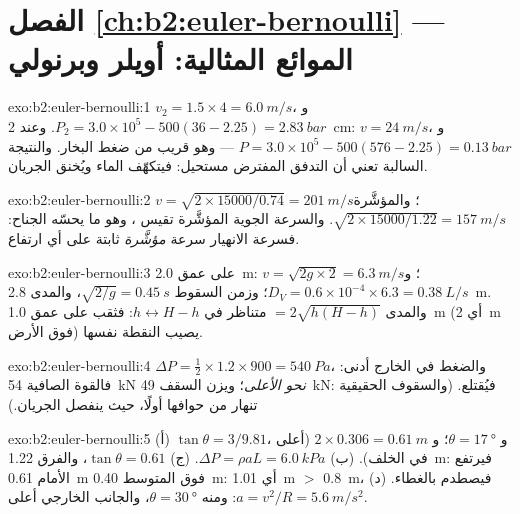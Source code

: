 \section*{الفصل \ref{ch:b2:euler-bernoulli} --- الموائع المثالية: أويلر وبرنولي}

\begin{solution}{exo:b2:euler-bernoulli:1}
$v_2 = 1.5 \times 4 = \qty{6.0}{m/s}$، و $P_2 = 3.0 \times 10^5 - 500(36 - 2.25) =
\qty{2.83}{bar}$. وعند \qty{2}{cm}: $v = \qty{24}{m/s}$، و $P = 3.0 \times 10^5 - 500
(576 - 2.25) = \qty{0.13}{bar}$ --- وهو قريب من ضغط البخار. والنتيجة
السالبة تعني أن التدفق المفترض مستحيل: فيتكهّف الماء
ويُخنق الجريان.
\end{solution}

\begin{solution}{exo:b2:euler-bernoulli:2}
$v = \sqrt{2 \times 15000/0.74} = \qty{201}{m/s}$؛ والمؤشَّرة $\sqrt{2 \times 15000/
1.22} = \qty{157}{m/s}$. والسرعة الجوية المؤشَّرة تقيس ،
وهو ما يحسّه الجناح: فسرعة الانهيار سرعة \emph{مؤشَّرة} ثابتة
على أي ارتفاع.
\end{solution}

\begin{solution}{exo:b2:euler-bernoulli:3}
على عمق \qty{2.0}{m}: $v = \sqrt{2g \times 2} = \qty{6.3}{m/s}$؛ و $D_V = 0.6 \times 10^{-4}
\times 6.3 = \qty{0.38}{L/s}$؛ وزمن السقوط $\sqrt{2/g} = \qty{0.45}{s}$، والمدى
\qty{2.8}{m}. والمدى $= 2\sqrt{h(H - h)}$ متناظر في $h \leftrightarrow H -
h$: فثقب على عمق \qty{1.0}{m} (أي \qty{2}{m} فوق الأرض) يصيب النقطة
نفسها.
\end{solution}

\begin{solution}{exo:b2:euler-bernoulli:4}
$\Delta P = \tfrac12 \times 1.2 \times 900 = \qty{540}{Pa}$، والضغط في الخارج أدنى:
فالقوة الصافية \qty{54}{kN} \emph{نحو الأعلى}؛ ويزن السقف \qty{49}{kN}: فيُقتلع.
(والسقوف الحقيقية تنهار من حوافها أولًا، حيث ينفصل الجريان.)
\end{solution}

\begin{solution}{exo:b2:euler-bernoulli:5}
(أ) $\tan\theta = 3/9.81$، و $\theta = \qty{17}{\degree}$؛ و $2 \times 0.306 = \qty{0.61}{m}$
(أعلى في الخلف). (ب) $\Delta P = \rho aL = \qty{6.0}{kPa}$. (ج) $\tan\theta =
0.61$، والفرق \qty{1.22}{m}: فيرتفع الأمام \qty{0.61}{m} فوق المتوسط
\qty{0.40}{m}: أي \qty{1.01}{m} $>$ \qty{0.8}{m}، فيصطدم بالغطاء. (د) $a = v^2/R =
\qty{5.6}{m/s^2}$: ومنه $\theta = \qty{30}{\degree}$، والجانب الخارجي أعلى.
\end{solution}

